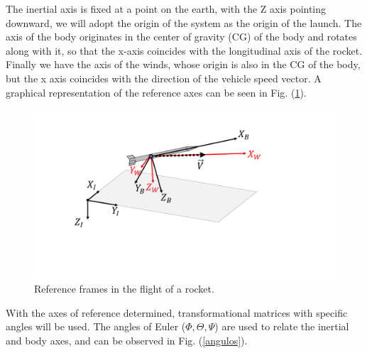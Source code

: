 \documentclass[10pt,fleqn,a4paper,twoside]{article}
\begin{document}
The inertial axis is fixed at a point on the earth, with the Z axis pointing downward, we will adopt the origin of the system as the origin of the launch. The axis of the body originates in the center of gravity (CG) of the body and rotates along with it, so that the x-axis coincides with the longitudinal axis of the rocket. Finally we have the axis of the winds, whose origin is also in the CG of the body, but the x axis coincides with the direction of the vehicle speed vector. A graphical representation of the reference axes can be seen in Fig. (\ref{ref_foguete}).


\begin{figure}[h!]
	\centering
	\includegraphics[trim = {4cm 5cm 8cm 1cm}, clip , angle=0, scale=0.3]{imagens/eixos_referencia}
	\caption{Reference frames in the flight of a rocket.}
	\label{ref_foguete}
\end{figure}


With the axes of reference determined, transformational matrices with specific angles will be used. The angles of Euler ($ \Phi, \Theta, \Psi $) are used to relate the inertial and body axes, and can be observed in Fig. (\ref{angulos}).
\end{document}
